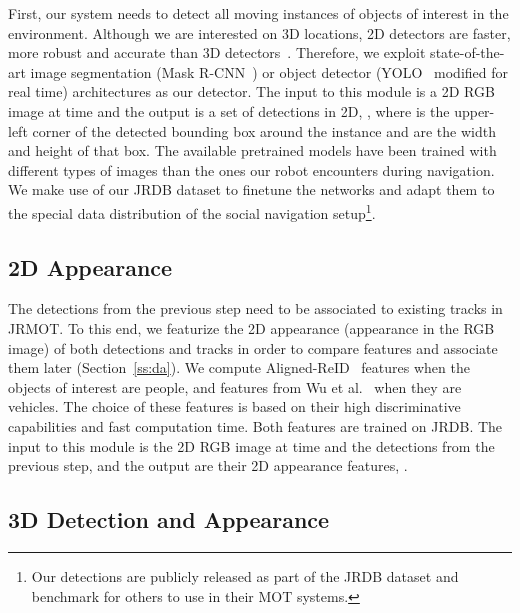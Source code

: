 \documentclass[letterpaper, 10 pt, conference]{ieeeconf}
\newcommand{\jrdb}{JRDB\xspace}
\newcommand{\methodname}{{JRMOT}\xspace}
\begin{document}
First, our system needs to detect all moving instances of objects of interest in the environment. Although we are interested on 3D locations, 2D detectors are faster, more robust and accurate than 3D detectors~\cite{8621614}. Therefore, we exploit state-of-the-art image segmentation (Mask R-CNN~\cite{he2017mask}) or object detector (YOLO~\cite{redmon2016you} modified for real time) architectures as our detector. 
The input to this module is a 2D RGB image at time  and the output is a set of  detections in 2D, , where  is the upper-left corner of the detected bounding box around the instance  and  are the width and height of that box. 
The available pretrained models have been trained with different types of images than the ones our robot encounters during navigation. We make use of our \jrdb dataset to finetune the networks and adapt them to the special data distribution of the social navigation setup\footnote{Our detections are publicly released as part of the \jrdb dataset and benchmark for others to use in their MOT systems.}. 

\subsection{2D Appearance}
\label{ss:appmod}

The detections from the previous step need to be associated to existing tracks in \methodname. To this end, we featurize the 2D appearance (appearance in the RGB image) of both detections and tracks in order to compare features and associate them later (Section~\ref{ss:da}).
We compute Aligned-ReID~\cite{zhang2017alignedreid} features when the objects of interest are people, and features from Wu et al.~\cite{wu2018vehicle} when they are vehicles. The choice of these features is based on their high discriminative capabilities and fast computation time.
Both features are trained on \jrdb.
The input to this module is the 2D RGB image at time  and the  detections from the previous step, and the output are their 2D appearance features, .


\subsection{3D Detection and Appearance}
\label{ss:3Ddetections}
\end{document}
